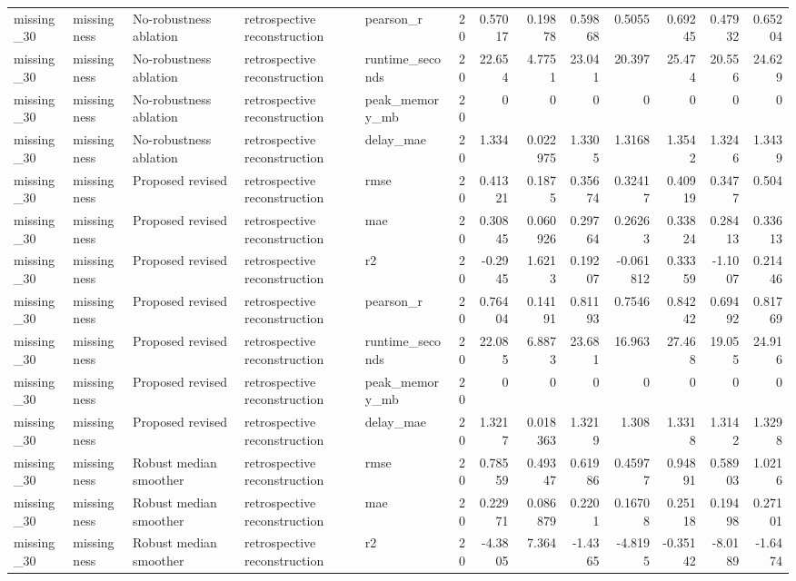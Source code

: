 \begin{table}[!htbp]
{{\begin{tabular}{lllllrrrrrrrr}
missing_30 & missingness & No-robustness ablation & retrospective reconstruction & pearson_r & 20 & 0.57017 & 0.19878 & 0.59868 & 0.5055 & 0.69245 & 0.47932 & 0.65204 \\
missing_30 & missingness & No-robustness ablation & retrospective reconstruction & runtime_seconds & 20 & 22.654 & 4.7751 & 23.041 & 20.397 & 25.474 & 20.556 & 24.629 \\
missing_30 & missingness & No-robustness ablation & retrospective reconstruction & peak_memory_mb & 20 & 0 & 0 & 0 & 0 & 0 & 0 & 0 \\
missing_30 & missingness & No-robustness ablation & retrospective reconstruction & delay_mae & 20 & 1.334 & 0.022975 & 1.3305 & 1.3168 & 1.3542 & 1.3246 & 1.3439 \\
missing_30 & missingness & Proposed revised & retrospective reconstruction & rmse & 20 & 0.41321 & 0.1875 & 0.35674 & 0.32417 & 0.40919 & 0.3477 & 0.504 \\
missing_30 & missingness & Proposed revised & retrospective reconstruction & mae & 20 & 0.30845 & 0.060926 & 0.29764 & 0.26263 & 0.33824 & 0.28413 & 0.33613 \\
missing_30 & missingness & Proposed revised & retrospective reconstruction & r2 & 20 & -0.2945 & 1.6213 & 0.19207 & -0.061812 & 0.33359 & -1.1007 & 0.21446 \\
missing_30 & missingness & Proposed revised & retrospective reconstruction & pearson_r & 20 & 0.76404 & 0.14191 & 0.81193 & 0.7546 & 0.84242 & 0.69492 & 0.81769 \\
missing_30 & missingness & Proposed revised & retrospective reconstruction & runtime_seconds & 20 & 22.085 & 6.8873 & 23.681 & 16.963 & 27.468 & 19.055 & 24.916 \\
missing_30 & missingness & Proposed revised & retrospective reconstruction & peak_memory_mb & 20 & 0 & 0 & 0 & 0 & 0 & 0 & 0 \\
missing_30 & missingness & Proposed revised & retrospective reconstruction & delay_mae & 20 & 1.3217 & 0.018363 & 1.3219 & 1.308 & 1.3318 & 1.3142 & 1.3298 \\
missing_30 & missingness & Robust median smoother & retrospective reconstruction & rmse & 20 & 0.78559 & 0.49347 & 0.61986 & 0.45977 & 0.94891 & 0.58903 & 1.0216 \\
missing_30 & missingness & Robust median smoother & retrospective reconstruction & mae & 20 & 0.22971 & 0.086879 & 0.2201 & 0.16708 & 0.25118 & 0.19498 & 0.27101 \\
missing_30 & missingness & Robust median smoother & retrospective reconstruction & r2 & 20 & -4.3805 & 7.364 & -1.4365 & -4.8195 & -0.35142 & -8.0189 & -1.6474 \\

\end{tabular}}}
\end{table}
